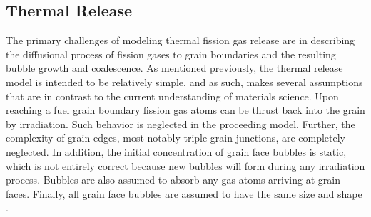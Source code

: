 \subsection{Thermal Release}
\label{subsec:thermal_release}

The primary challenges of modeling thermal fission gas release are in describing the diffusional process of fission gases to grain boundaries and the resulting bubble growth and coalescence. As mentioned previously, the thermal release model is intended to be relatively simple, and as such, makes several assumptions that are in contrast to the current understanding of materials science. Upon reaching a fuel grain boundary fission gas atoms can be thrust back into the grain by irradiation. Such behavior is neglected in the proceeding model. Further, the complexity of grain edges, most notably triple grain junctions, are completely neglected. In addition, the initial concentration of grain face bubbles is static, which is not entirely correct because new bubbles will form during any irradiation process. Bubbles are also assumed to absorb any gas atoms arriving at grain faces. Finally, all grain face bubbles are assumed to have the same size and shape \cite{Pastore1}.  

